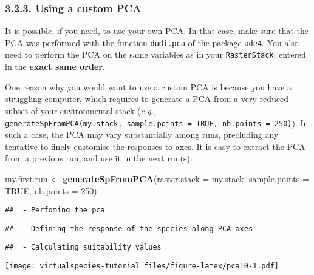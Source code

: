 \documentclass[]{article}
\newenvironment{Shaded}{\begin{snugshade}}{\end{snugshade}}
\newcommand{\KeywordTok}[1]{\textcolor[rgb]{0.13,0.29,0.53}{\textbf{#1}}}
\newcommand{\DataTypeTok}[1]{\textcolor[rgb]{0.13,0.29,0.53}{#1}}
\newcommand{\DecValTok}[1]{\textcolor[rgb]{0.00,0.00,0.81}{#1}}
\newcommand{\StringTok}[1]{\textcolor[rgb]{0.31,0.60,0.02}{#1}}
\newcommand{\CommentTok}[1]{\textcolor[rgb]{0.56,0.35,0.01}{\textit{#1}}}
\newcommand{\OtherTok}[1]{\textcolor[rgb]{0.56,0.35,0.01}{#1}}
\newcommand{\OperatorTok}[1]{\textcolor[rgb]{0.81,0.36,0.00}{\textbf{#1}}}
\newcommand{\NormalTok}[1]{#1}
\begin{document}
\subsubsection{3.2.3. Using a custom PCA}\label{using-a-custom-pca}

It is possible, if you need, to use your own PCA. In that case, make
sure that the PCA was performed with the function \texttt{dudi.pca} of
the package
\href{http://cran.r-project.org/web/packages/ade4/index.html}{\texttt{ade4}}.
You also need to perform the PCA on the same variables as in your
\texttt{RasterStack}, entered in the \textbf{exact same order}.

One reason why you would want to use a custom PCA is because you have a
struggling computer, which requires to generate a PCA from a very
reduced subset of your environmental stack (\emph{e.g.},
\texttt{generateSpFromPCA(my.stack,\ sample.points\ =\ TRUE,\ nb.points\ =\ 250)}).
In such a case, the PCA may vary substantially among runs, precluding
any tentative to finely customise the responses to axes. It is easy to
extract the PCA from a previous run, and use it in the next run(s):

\begin{Shaded}
\begin{Highlighting}[]
\NormalTok{my.first.run <-}\StringTok{ }\KeywordTok{generateSpFromPCA}\NormalTok{(}\DataTypeTok{raster.stack =}\NormalTok{ my.stack, }
                                  \DataTypeTok{sample.points =} \OtherTok{TRUE}\NormalTok{, }\DataTypeTok{nb.points =} \DecValTok{250}\NormalTok{)}
\end{Highlighting}
\end{Shaded}

\begin{verbatim}
##  - Perfoming the pca
\end{verbatim}

\begin{verbatim}
##  - Defining the response of the species along PCA axes
\end{verbatim}

\begin{verbatim}
##  - Calculating suitability values
\end{verbatim}

\texttt{[image: virtualspecies-tutorial\_files/figure-latex/pca10-1.pdf]}

\begin{Shaded}
\end{Shaded}
\end{document}
